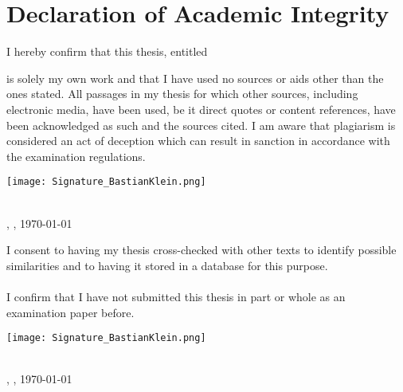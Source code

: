 \chapter*{Declaration of Academic Integrity}
I hereby confirm that this thesis, entitled 

\begin{center}
	\textit{\printtitle}
\end{center}

is solely my own work and that I have used no sources or aids other than the ones stated. All passages in my thesis for which other sources, including electronic media, have been used, be it direct quotes or content references, have been acknowledged as such and the sources cited. I am aware that plagiarism is considered an act of deception which can result in sanction in accordance with the examination regulations.

\vspace{0.75cm}
\texttt{[image: Signature\_BastianKlein.png]} \\
\parbox{17em}{\hrulefill} \\
\printname,
\printcity, \today
\vspace{0.75cm}
\par

I consent to having my thesis cross-checked with other texts to identify possible similarities and to having it stored in a database for this purpose.
\\
\\
I confirm that I have not submitted this thesis in part or whole as an examination paper before.

\vspace{0.75cm}
\texttt{[image: Signature\_BastianKlein.png]} \\
\parbox{17em}{\hrulefill} \\
\printname, \printcity, \today
